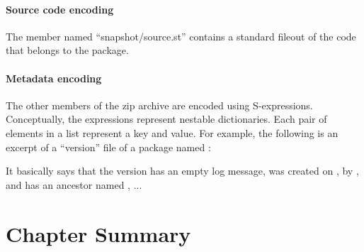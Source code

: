 \documentclass[a4paper,10pt,twoside]{book}
\begin{document}
\paragraph{Source code encoding}

The member named ``snapshot/source.st'' contains a standard fileout of the code that belongs to the package.

\paragraph{Metadata encoding}

The other members of the zip archive are encoded using S-expressions. Conceptually, the expressions represent nestable dictionaries. Each pair of elements in a list represent a key and value. For example, the following is an excerpt of a ``version'' file of a package named :


It basically says that the version  has an empty log message, was created on , by , and has an ancestor named , ...





\section{Chapter Summary}
\end{document}
